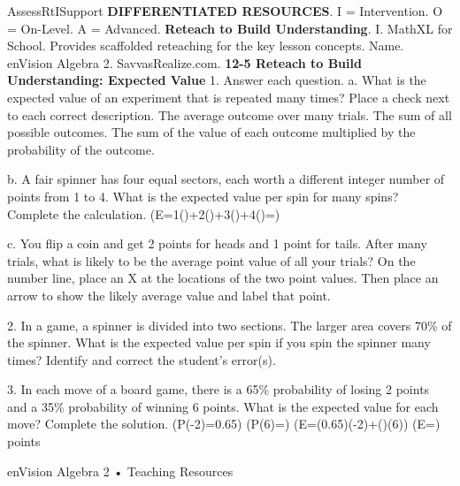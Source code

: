\documentclass{article}
\newenvironment{te-addendum}[2]{}{}     %
\newcommand{\answer}[1]{}               %
\newcommand{\placeholder}[2]{}          %
\newcommand{\te}[1]{}                   %
\begin{document}
\begin{te-addendum}{Assess}{RtISupport}
\textbf{DIFFERENTIATED RESOURCES}. I = Intervention. O = On-Level. A = Advanced.
\textbf{Reteach to Build Understanding}. I. MathXL for School.
Provides scaffolded reteaching for the key lesson concepts.
Name. enVision Algebra 2. SavvasRealize.com.
\textbf{12-5 Reteach to Build Understanding: Expected Value}
1. Answer each question.
a. What is the expected value of an experiment that is repeated many times? Place a check next to each correct description.
The average outcome over many trials.
The sum of all possible outcomes.
The sum of the value of each outcome multiplied by the probability of the outcome.
\answer{First and third descriptions checked.}
b. A fair spinner has four equal sectors, each worth a different integer number of points from 1 to 4. What is the expected value per spin for many spins? Complete the calculation.
(E=1()+2()+3()+4()=)
\answer{(E=1(0.25)+2(0.25)+3(0.25)+4(0.25)=2.5)}
c. You flip a coin and get 2 points for heads and 1 point for tails. After many trials, what is likely to be the average point value of all your trials? On the number line, place an X at the locations of the two point values. Then place an arrow to show the likely average value and label that point.
\answer{Xs at 1 and 2; arrow at 1.5.}
\placeholder{graph}{Horizontal number line with arrowheads at both ends, ticks 0,1,2,3. Magenta X above 1 and above 2; upward magenta arrow halfway between 1 and 2 labeled 1.5.}
2. In a game, a spinner is divided into two sections. The larger area covers 70\% of the spinner. What is the expected value per spin if you spin the spinner many times? Identify and correct the student's error(s).
\placeholder{diagram}{Circular spinner with 30 percent upper-left sector labeled 2 points and larger 70 percent sector labeled -1 point. Dividing rays toward top and lower left; black center arrow points slightly up-right.}
\te{Student work: Expected value of each section = probability (\times) point value. Expected value of larger section (=(0.7)\times(-1)=-0.7). Expected value of smaller section (=(0.7)\times(2)=1.4). Expected value (=-0.7+1.4=0.7) point.}
\answer{(E(smaller\ section)=0.3\times2=0.6). (E=-0.7+0.6=-0.1) point.}
3. In each move of a board game, there is a 65\% probability of losing 2 points and a 35\% probability of winning 6 points. What is the expected value for each move? Complete the solution.
(P(-2)=0.65)
(P(6)=)
(E=(0.65)(-2)+()(6))
(E=) points
\answer{0.35; 0.35; 0.8 points}
enVision Algebra 2 • Teaching Resources
\end{te-addendum}
\end{document}
